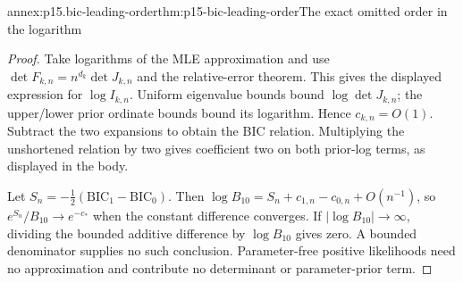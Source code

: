 \begin{annexitem}{annex:p15.bic-leading-order}{thm:p15-bic-leading-order}{The exact omitted order in the logarithm}
\begin{proof}
Take logarithms of the MLE approximation and use
\(\det F_{k,n}=n^{d_k}\det J_{k,n}\) and the relative-error theorem.
This gives the displayed expression for \(\log I_{k,n}\). Uniform
eigenvalue bounds bound \(\log\det J_{k,n}\); the upper/lower prior
ordinate bounds bound its logarithm. Hence \(c_{k,n}=O(1)\).
Subtract the two expansions to obtain the BIC relation. Multiplying
the unshortened relation by two gives coefficient two on both prior-log
terms, as displayed in the body.

Let \(S_n=-\tfrac12(\mathrm{BIC}_1-\mathrm{BIC}_0)\).
Then \(\log B_{10}=S_n+c_{1,n}-c_{0,n}+O(n^{-1})\), so
\(e^{S_n}/B_{10}\to e^{-c_*}\) when the constant difference converges.
If \(|\log B_{10}|\to\infty\), dividing the bounded additive difference
by \(\log B_{10}\) gives zero. A bounded denominator supplies no such
conclusion. Parameter-free positive likelihoods need no approximation
and contribute no determinant or parameter-prior term.
\end{proof}
\end{annexitem}

